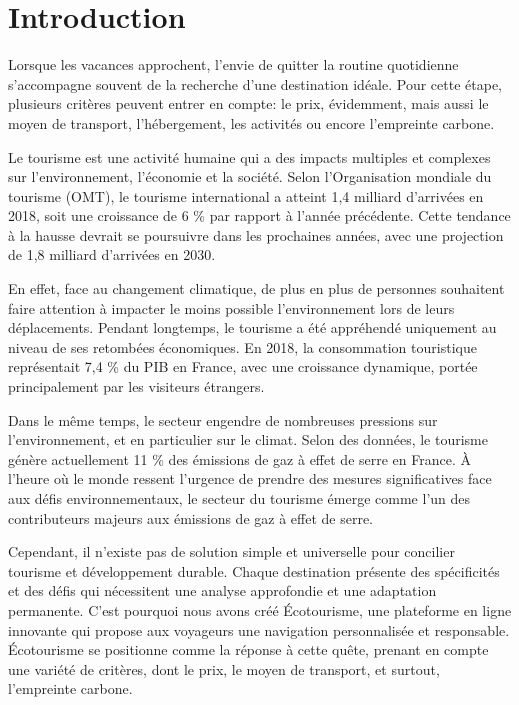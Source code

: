 \documentclass[mstat,12pt]{unswthesis}
\begin{document}
\begin{adjustwidth}{-2cm}{}
\hypertarget{introduction}{%
\chapter{Introduction}\label{introduction}}

Lorsque les vacances approchent, l'envie de quitter la routine
quotidienne s'accompagne souvent de la recherche d'une destination
idéale. Pour cette étape, plusieurs critères peuvent entrer en compte:
le prix, évidemment, mais aussi le moyen de transport, l'hébergement,
les activités ou encore l'empreinte carbone.

\par

Le tourisme est une activité humaine qui a des impacts multiples et
complexes sur l'environnement, l'économie et la société. Selon
l'Organisation mondiale du tourisme (OMT), le tourisme international a
atteint 1,4 milliard d'arrivées en 2018, soit une croissance de 6 \% par
rapport à l'année précédente. Cette tendance à la hausse devrait se
poursuivre dans les prochaines années, avec une projection de 1,8
milliard d'arrivées en 2030.

\par

En effet, face au changement climatique, de plus en plus de personnes
souhaitent faire attention à impacter le moins possible l'environnement
lors de leurs déplacements. Pendant longtemps, le tourisme a été
appréhendé uniquement au niveau de ses retombées économiques. En 2018,
la consommation touristique représentait 7,4 \% du PIB en France, avec
une croissance dynamique, portée principalement par les visiteurs
étrangers.

\par

Dans le même temps, le secteur engendre de nombreuses pressions sur
l'environnement, et en particulier sur le climat. Selon des données, le
tourisme génère actuellement 11 \% des émissions de gaz à effet de serre
en France. À l'heure où le monde ressent l'urgence de prendre des
mesures significatives face aux défis environnementaux, le secteur du
tourisme émerge comme l'un des contributeurs majeurs aux émissions de
gaz à effet de serre.

\par

Cependant, il n'existe pas de solution simple et universelle pour
concilier tourisme et développement durable. Chaque destination présente
des spécificités et des défis qui nécessitent une analyse approfondie et
une adaptation permanente. C'est pourquoi nous avons créé Écotourisme,
une plateforme en ligne innovante qui propose aux voyageurs une
navigation personnalisée et responsable. Écotourisme se positionne comme
la réponse à cette quête, prenant en compte une variété de critères,
dont le prix, le moyen de transport, et surtout, l'empreinte carbone.


\end{adjustwidth}
\end{document}
